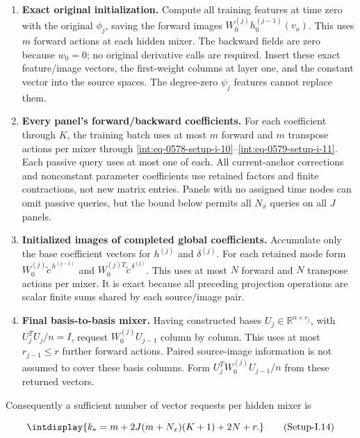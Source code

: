 \begin{enumerate}
\item[1.] \textbf{Exact original initialization.} Compute all training features at time zero with the original \(\phi_j\), saving the forward images \(W_0^{(j)}h_0^{(j-1)}(v_a)\). This uses \(m\) forward actions at each hidden mixer. The backward fields are zero because \(w_0=0\); no original derivative calls are required. Insert these exact feature/image vectors, the first-weight columns at layer one, and the constant vector into the source spaces. The degree-zero \(\psi_j\) features cannot replace them.
\item[2.] \textbf{Every panel's forward/backward coefficients.} For each coefficient through \(K\), the training batch uses at most \(m\) forward and \(m\) transpose actions per mixer through \hyperref[int:eq-setup-i-10]{\eqref{int:eq-0578-setup-i-10}}--\allowbreak \hyperref[int:eq-setup-i-11]{\eqref{int:eq-0579-setup-i-11}}. Each passive query uses at most one of each. All current-anchor corrections and nonconstant parameter coefficients use retained factors and finite contractions, not new matrix entries. Panels with no assigned time nodes can omit passive queries, but the bound below permits all \(N_x\) queries on all \(J\) panels.
\item[3.] \textbf{Initialized images of completed global coefficients.} Accumulate only the base coefficient vectors for \(h^{(j)}\) and \(\delta^{(j)}\). For each retained mode form \(W_0^{(j)}\widetilde c^{\,\allowbreak h^{(j-1)}}\) and \(W_0^{(j)T}\widetilde c^{\,\allowbreak \delta^{(j)}}\). This uses at most \(N\) forward and \(N\) transpose actions per mixer. It is exact because all preceding projection operations are scalar finite sums shared by each source/image pair.
\item[4.] \textbf{Final basis-to-basis mixer.} Having constructed bases \(U_j\in\mathbb R^{n\times r_j}\), with \(U_j^TU_j/n=I\), request \(W_0^{(j)}U_{j-1}\) column by column. This uses at most \(r_{j-1}\le r\) further forward actions. Paired source-image information is not assumed to cover these basis columns. Form \(U_j^TW_0^{(j)}U_{j-1}/n\) from these returned vectors.
\end{enumerate}


Consequently a sufficient number of vector requests per hidden mixer is


\label{int:eq-setup-i-14}
\begingroup\renewcommand{\theHequation}{intdisplay.1096}
\begin{equation}
\intdisplay{
k_* = m+2J(m+N_x)(K+1)+2N+r.
}
\tag{Setup-I.14}
\label{int:eq-0582-setup-i-14}
\end{equation}
\endgroup

